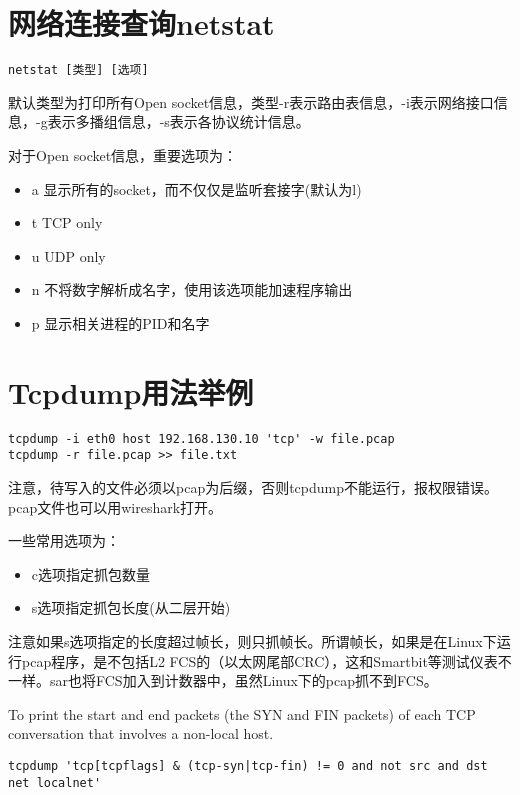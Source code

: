 \section{网络连接查询netstat}

\label{nettool:netstat}

\begin{verbatim}
netstat [类型] [选项]
\end{verbatim}
默认类型为打印所有Open socket信息，类型-r表示路由表信息，-i表示网络接口信息，-g表示多播组信息，-s表示各协议统计信息。

对于Open socket信息，重要选项为：
\begin{itemize}
    \item 
a 显示所有的socket，而不仅仅是监听套接字(默认为l)
    \item 
t TCP only
    \item 
u UDP only
    \item 
n 不将数字解析成名字，使用该选项能加速程序输出
    \item 
p 显示相关进程的PID和名字
\end{itemize}


\section{Tcpdump用法举例}

\begin{verbatim}
tcpdump -i eth0 host 192.168.130.10 'tcp' -w file.pcap
tcpdump -r file.pcap >> file.txt
\end{verbatim}
注意，待写入的文件必须以pcap为后缀，否则tcpdump不能运行，报权限错误。pcap文件也可以用wireshark打开。

一些常用选项为：
\begin{itemize}
    \item 
        c选项指定抓包数量
    \item 
        s选项指定抓包长度(从二层开始)
\end{itemize}

注意如果s选项指定的长度超过帧长，则只抓帧长。所谓帧长，如果是在Linux下运行pcap程序，是不包括L2 FCS的（以太网尾部CRC），这和Smartbit等测试仪表不一样。sar也将FCS加入到计数器中，虽然Linux下的pcap抓不到FCS。



 To print the start and end packets (the SYN and FIN packets) of each TCP conversation that involves a non-local host.
\begin{verbatim}
tcpdump 'tcp[tcpflags] & (tcp-syn|tcp-fin) != 0 and not src and dst net localnet'
\end{verbatim}



